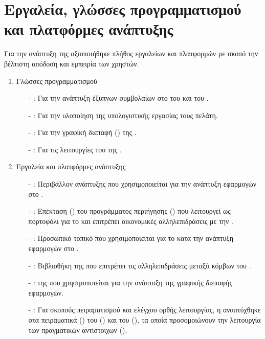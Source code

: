 \section{Εργαλεία, γλώσσες προγραμματισμού και πλατφόρμες ανάπτυξης}
Για την ανάπτυξη της  αξιοποιήθηκε πλήθος εργαλείων και πλατφορμών με σκοπό την βέλτιστη απόδοση και εμπειρία των χρηστών.

\begin{enumerate}
    \item Γλώσσες προγραμματισμού
    \begin{itemize}
        \item[-] : Για την ανάπτυξη έξυπνων συμβολαίων στο  του  και του . 
        \item[-] : Για την υλοποίηση της υπολογιστικής εργασίας τους πελάτη.
        \item[-] : Για την γραφική διεπαφή () της .
        \item[-] : Για τις λειτουργίες του  της .
    \end{itemize}
    \item Εργαλεία και πλατφόρμες ανάπτυξης
    \begin{itemize}
        \item[-] : Περιβάλλον ανάπτυξης που χρησιμοποιείται για την ανάπτυξη εφαρμογών στο  \cite{ref44}.
        \item[-] : Επέκταση () του προγράμματος περιήγησης () που λειτουργεί ως πορτοφόλι για το  και επιτρέπει οικονομικές αλληλεπιδράσεις με την  \cite{ref43}.
        \item[-] : Προσωπικό τοπικό  που χρησιμοποιείται για το  κατά την ανάπτυξη εφαρμογών στο .
        \item[-] : Βιβλιοθήκη της  που επιτρέπει τις αλληλεπιδράσεις μεταξύ κόμβων του .
        \item[-] :  της  που χρησιμοποιείται για την ανάπτυξη της γραφικής διεπαφής εφαρμογών.
        \item[-] : Για σκοπούς πειραματισμού και ελέγχου ορθής λειτουργίας, η  αναπτύχθηκε στα πειραματικά  () του  () και του  (), τα οποία προσομοιώνουν την λειτουργία των πραγματικών αντίστοιχων  ().
    \end{itemize}
\end{enumerate}

